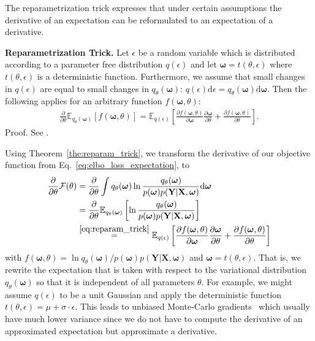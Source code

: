 \documentclass[runningheads]{llncs}
\begin{document}
The reparametrization trick expresses that under certain assumptions the derivative of an expectation can be reformulated to an expectation of a derivative. 

\begin{theorem}
\label{the:reparam_trick}
\textbf{Reparametrization Trick.} Let $\epsilon$ be a random variable which is distributed according to a parameter free distribution $q(\epsilon)$ and let $\boldsymbol{\omega} = t(\theta, \epsilon)$ where $t(\theta, \epsilon)$ is a deterministic function. Furthermore, we assume that small changes in $q(\epsilon)$ are equal to small changes in $q_\theta(\boldsymbol{\omega})$: $q(\epsilon)\mathrm{d}\epsilon = q_\theta(\boldsymbol{\omega})\mathrm{d}\boldsymbol{\omega}$.
Then the following applies for an arbitrary function $f(\boldsymbol{\omega}, \theta)$:
\begin{align}
\frac{\partial}{\partial\theta} \mathbb{E}_{q_\theta(\boldsymbol{\omega})} \left[f(\boldsymbol{\omega}, \theta)\right]= 
\mathbb{E}_{q(\epsilon)}\left[ \frac{\partial f(\boldsymbol{\omega}, \theta)}{\partial\boldsymbol{\omega}}\frac{\partial\boldsymbol{\omega}}{\partial\theta} + \frac{\partial f(\boldsymbol{\omega}, \theta)}{\partial \theta}\right].\label{eq:reparam_trick}
\end{align}
Proof. See \cite{BlundellBBB}.
\end{theorem}
Using Theorem~\ref{the:reparam_trick}, we transform the derivative of our objective function from Eq.~\ref{eq:elbo_loss_expectation}, to
\begin{align}
    \frac{\partial}{\partial\theta}\mathcal{F}(\theta) &= \frac{\partial}{\partial\theta}\int q_\theta(\boldsymbol{\omega}) \ln \frac{q_\theta(\boldsymbol{\omega})}{p(\boldsymbol{\omega})p(\mathbf{Y} | \mathbf{X}, \boldsymbol{\omega})}\mathrm{d}\boldsymbol{\omega} \\
    &= \frac{\partial}{\partial\theta}\mathbb{E}_{q_\theta(\boldsymbol{\omega})}\left[ \ln \frac{q_\theta(\boldsymbol{\omega})}{p(\boldsymbol{\omega})p(\mathbf{Y} | \mathbf{X}, \boldsymbol{\omega})} \right]\\
    &\overset{\eqref{eq:reparam_trick}}{=}
    \mathbb{E}_{q(\epsilon)}\left[ \frac{\partial f(\boldsymbol{\omega}, \theta)}{\partial\boldsymbol{\omega}}\frac{\partial\boldsymbol{\omega}}{\partial\theta} + \frac{\partial f(\boldsymbol{\omega}, \theta)}{\partial \theta} \right]
    \label{eq:elbo_bayes_by_backprop}
\end{align}
with $f(\boldsymbol{\omega}, \theta) = \ln q_\theta(\boldsymbol{\omega}) / p(\boldsymbol{\omega})p(\mathbf{Y} | \mathbf{X}, \boldsymbol{\omega})$ and $\boldsymbol{\omega} = t(\theta, \epsilon)$.
That is, we rewrite the expectation that is taken with respect to the variational distribution $q_\theta(\boldsymbol{\omega})$ so that it is independent of all parameters $\theta$.
For example, we might assume $q(\epsilon)$ to be a unit Gaussian and apply the deterministic function $t(\theta, \epsilon) = \mu + \sigma \cdot \epsilon$.
This leads to unbiased Monte-Carlo gradients~\cite{BlundellBBB} which usually have much lower variance since we do not have to compute the derivative of an approximated expectation but approximate a derivative.
\end{document}
